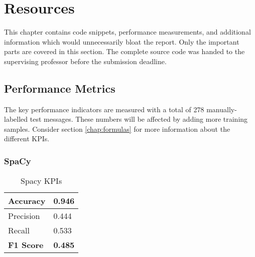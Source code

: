 \chapter{Resources}

This chapter contains code snippets, performance measurements, and additional information which would unnecessarily bloat the report. Only the important parts are covered in this section. The complete source code was handed to the supervising professor before the submission deadline.

\section{Performance Metrics}

The key performance indicators are measured with a total of 278 manually-labelled test messages. These numbers will be affected by adding more training samples. Consider section \ref{chap:formulas} for more information about the different KPIs.

\subsection{SpaCy}

\begin{table}[ht!]
    \centering
    \begin{tabular}{|p{6em}|p{3em}|}
        \hline
        Accuracy & 0.946 \\
        \hline
        Precision & 0.444 \\
        \hline
        Recall & 0.533 \\
        \hline
        \textbf{F1 Score} & \textbf{0.485} \\
        \hline
    \end{tabular}
    \caption{Spacy KPIs}
    \label{tbl:perf-spacy}
\end{table}

